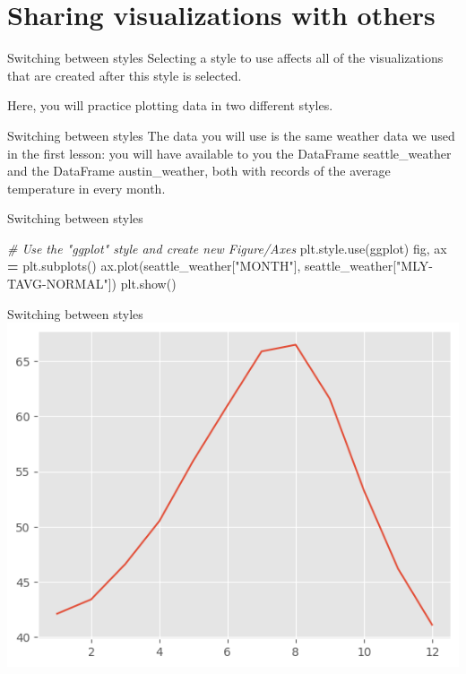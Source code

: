 \documentclass[
  ignorenonframetext,
]{beamer}
\newenvironment{Shaded}{\begin{snugshade}}{\end{snugshade}}
\newcommand{\CommentTok}[1]{\textcolor[rgb]{0.56,0.35,0.01}{\textit{#1}}}
\newcommand{\NormalTok}[1]{#1}
\newcommand{\OperatorTok}[1]{\textcolor[rgb]{0.81,0.36,0.00}{\textbf{#1}}}
\newcommand{\StringTok}[1]{\textcolor[rgb]{0.31,0.60,0.02}{#1}}
\begin{document}
\section{Sharing visualizations with
others}\label{sharing-visualizations-with-others}

\begin{frame}{Switching between styles}
\label{switching-between-styles}
Selecting a style to use affects all of the visualizations that are
created after this style is selected.

Here, you will practice plotting data in two different styles.
\end{frame}

\begin{frame}{Switching between styles}
\label{switching-between-styles-1}
The data you will use is the same weather data we used in the first
lesson: you will have available to you the DataFrame seattle\_weather
and the DataFrame austin\_weather, both with records of the average
temperature in every month.
\end{frame}

\begin{frame}[fragile]{Switching between styles}
\label{switching-between-styles-2}

\begin{Shaded}
\begin{Highlighting}[]
\CommentTok{\# Use the "ggplot" style and create new Figure/Axes}
\NormalTok{plt.style.use(}\StringTok{\textquotesingle{}ggplot\textquotesingle{}}\NormalTok{)}
\NormalTok{fig, ax }\OperatorTok{=}\NormalTok{ plt.subplots()}
\NormalTok{ax.plot(seattle\_weather[}\StringTok{"MONTH"}\NormalTok{], seattle\_weather[}\StringTok{"MLY{-}TAVG{-}NORMAL"}\NormalTok{])}
\NormalTok{plt.show()}
\end{Highlighting}
\end{Shaded}
\end{frame}

\begin{frame}{Switching between styles}
\label{switching-between-styles-3}
\includegraphics{../images/im249.png}
\end{frame}
\end{document}
